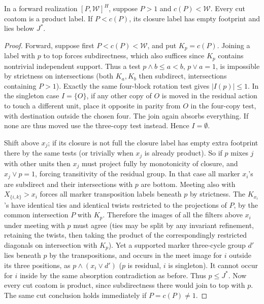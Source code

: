 \begin{proposition}\label{t:weighted-forward-projections}
In a forward realization \([P,\mathcal W]^H\), suppose \(P>1\) and
\(c(P)<\mathcal W\).  Every cut coatom is a product label.  If
\(P<c(P)\), its closure label has empty footprint and lies below \(J^*\).
\end{proposition}
\begin{proof}
Forward, suppose first \(P<c(P)<\mathcal W\), and put \(K_p=c(P)\). Joining a label with \(p\) to
top forces subdirectness, which also suffices since \(K_p\) contains nontrivial independent
support. Thus a test \(p\wedge b\le a<b\), \(p\vee a=1\), is impossible by strictness on
intersections (both \(K_a,K_b\) then subdirect, intersections containing \(P>1\)). Exactly the
same four-block rotation test gives \(|I(p)|\le1\). In the singleton case \(I=\{O\}\), if any
other copy of \(O\) is moved in the residual action to touch a different unit, place it opposite
in parity from \(O\) in the four-copy test, with destination outside the chosen four. The join
again absorbs everything. If none are thus moved use the three-copy test instead. Hence
\(I=\emptyset\).

Shift above \(x_j\); if its closure is not full the closure label has empty extra footprint there
by the same tests (or trivially when \(x_j\) is already product). So if \(p\) mixes \(j\) with
other units then \(x_j\) must project fully by monotonicity of closure, and \(x_j\vee p=1\),
forcing transitivity of the residual group. In that case all marker \(x_i\)'s are subdirect and
their intersections with \(p\) are bottom. Meeting also with \(X_{\{i,k\}}>x_i\) forces all marker
transposition labels beneath \(p\) by strictness. The \(K_{x_i}\)'s have identical ties and
identical twists restricted to the projections of \(P\), by the common intersection \(P\) with
\(K_p\). Therefore the images of all the filters above \(x_i\) under meeting with \(p\) must agree
(ties may be split by any invariant refinement, retaining the twists, then taking the product of
the correspondingly restricted diagonals on intersection with \(K_p\)). Yet a supported marker
three-cycle group \(d'\) lies beneath \(p\) by the transpositions, and occurs in the meet image
for \(i\) outside its three positions, as \(p\wedge(x_i\vee d')\) (\(p\) is residual, \(i\) is
singleton). It cannot occur for \(i\) inside by the same absorption contradiction as before. Thus
\(p\le J^*\). Now every cut coatom is product, since subdirectness there would join to top with
\(p\). The same cut conclusion holds immediately if \(P=c(P)\ne1\).


\end{proof}
